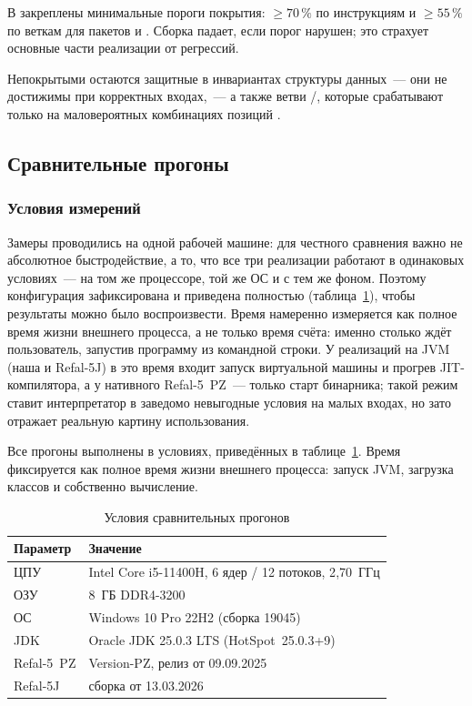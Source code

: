 В  закреплены минимальные пороги покрытия:
$\ge 70\,\%$ по инструкциям и $\ge 55\,\%$ по веткам для пакетов
 и . Сборка 
падает, если порог нарушен; это страхует основные части реализации от
регрессий.

Непокрытыми остаются защитные  в инвариантах
структуры данных~--- они не достижимы при корректных входах,~--- а также
ветви /, которые срабатывают только на
маловероятных комбинациях позиций .

\subsection{Сравнительные прогоны}
\label{subsec:benchmarks}

\subsubsection{Условия измерений}

Замеры проводились на одной рабочей машине: для честного сравнения важно не абсолютное
быстродействие, а то, что все три реализации работают в одинаковых условиях~--- на том же
процессоре, той же ОС и с тем же фоном. Поэтому конфигурация зафиксирована и приведена
полностью (таблица~\ref{tab:bench-env}), чтобы результаты можно было воспроизвести.
Время намеренно измеряется как полное время жизни внешнего процесса, а не только
 время счёта: именно столько ждёт пользователь, запустив программу из
командной строки. У реализаций на JVM (наша и Refal-5J) в это время входит запуск
виртуальной машины и прогрев JIT-компилятора, а у нативного Refal-5~PZ~--- только старт
бинарника; такой режим ставит интерпретатор в заведомо невыгодные условия на малых
входах, но зато отражает реальную картину использования.

Все прогоны выполнены в условиях, приведённых в
таблице~\ref{tab:bench-env}. Время фиксируется как полное время жизни
внешнего процесса: запуск JVM, загрузка классов и собственно вычисление.

\begin{table}[!htb]
\caption{\centering Условия сравнительных прогонов}
\label{tab:bench-env}
\centering
\small
\begin{tabular}{|l|p{9cm}|}
\hline
\textbf{Параметр} & \textbf{Значение} \\
\hline
ЦПУ      & Intel Core i5-11400H, 6 ядер / 12 потоков, 2{,}70~ГГц \\
\hline
ОЗУ      & 8~ГБ DDR4-3200 \\
\hline
ОС       & Windows 10 Pro 22H2 (сборка 19045) \\
\hline
JDK      & Oracle JDK 25.0.3 LTS (HotSpot~25.0.3+9) \\
\hline
Refal-5~PZ   & Version-PZ, релиз от 09.09.2025 \\
\hline
Refal-5J     & сборка от 13.03.2026 \\
\hline
\end{tabular}
\end{table}

